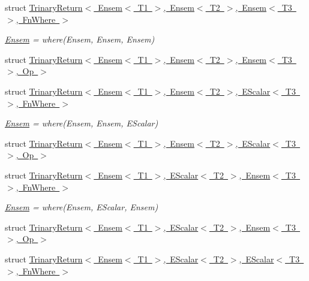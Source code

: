 \begin{DoxyCompactItemize}
\item 
struct \mbox{\hyperlink{structENSEM_1_1TrinaryReturn_3_01Ensem_3_01T1_01_4_00_01Ensem_3_01T2_01_4_00_01Ensem_3_01T3_01_4_00_01FnWhere_01_4}{Trinary\+Return$<$ Ensem$<$ T1 $>$, Ensem$<$ T2 $>$, Ensem$<$ T3 $>$, Fn\+Where $>$}}
\begin{DoxyCompactList}\small\item\em \mbox{\hyperlink{classENSEM_1_1Ensem}{Ensem}} = where(\+Ensem, Ensem, Ensem) \end{DoxyCompactList}\item 
struct \mbox{\hyperlink{structENSEM_1_1TrinaryReturn_3_01Ensem_3_01T1_01_4_00_01Ensem_3_01T2_01_4_00_01Ensem_3_01T3_01_4_00_01Op_01_4}{Trinary\+Return$<$ Ensem$<$ T1 $>$, Ensem$<$ T2 $>$, Ensem$<$ T3 $>$, Op $>$}}
\item 
struct \mbox{\hyperlink{structENSEM_1_1TrinaryReturn_3_01Ensem_3_01T1_01_4_00_01Ensem_3_01T2_01_4_00_01EScalar_3_01T3_01_4_00_01FnWhere_01_4}{Trinary\+Return$<$ Ensem$<$ T1 $>$, Ensem$<$ T2 $>$, E\+Scalar$<$ T3 $>$, Fn\+Where $>$}}
\begin{DoxyCompactList}\small\item\em \mbox{\hyperlink{classENSEM_1_1Ensem}{Ensem}} = where(\+Ensem, Ensem, E\+Scalar) \end{DoxyCompactList}\item 
struct \mbox{\hyperlink{structENSEM_1_1TrinaryReturn_3_01Ensem_3_01T1_01_4_00_01Ensem_3_01T2_01_4_00_01EScalar_3_01T3_01_4_00_01Op_01_4}{Trinary\+Return$<$ Ensem$<$ T1 $>$, Ensem$<$ T2 $>$, E\+Scalar$<$ T3 $>$, Op $>$}}
\item 
struct \mbox{\hyperlink{structENSEM_1_1TrinaryReturn_3_01Ensem_3_01T1_01_4_00_01EScalar_3_01T2_01_4_00_01Ensem_3_01T3_01_4_00_01FnWhere_01_4}{Trinary\+Return$<$ Ensem$<$ T1 $>$, E\+Scalar$<$ T2 $>$, Ensem$<$ T3 $>$, Fn\+Where $>$}}
\begin{DoxyCompactList}\small\item\em \mbox{\hyperlink{classENSEM_1_1Ensem}{Ensem}} = where(\+Ensem, E\+Scalar, Ensem) \end{DoxyCompactList}\item 
struct \mbox{\hyperlink{structENSEM_1_1TrinaryReturn_3_01Ensem_3_01T1_01_4_00_01EScalar_3_01T2_01_4_00_01Ensem_3_01T3_01_4_00_01Op_01_4}{Trinary\+Return$<$ Ensem$<$ T1 $>$, E\+Scalar$<$ T2 $>$, Ensem$<$ T3 $>$, Op $>$}}
\item 
struct \mbox{\hyperlink{structENSEM_1_1TrinaryReturn_3_01Ensem_3_01T1_01_4_00_01EScalar_3_01T2_01_4_00_01EScalar_3_01T3_01_4_00_01FnWhere_01_4}{Trinary\+Return$<$ Ensem$<$ T1 $>$, E\+Scalar$<$ T2 $>$, E\+Scalar$<$ T3 $>$, Fn\+Where $>$}}

\end{DoxyCompactItemize}
